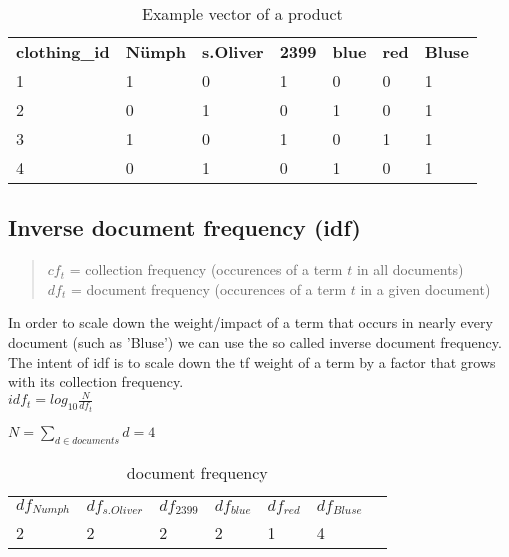 \noindent
\begin{table}[h]
    \begin{center}
    \begin{tabular}{ l l l l l l l }
        \rowcolor{Gray}
        \textbf{clothing\_id}   & \textbf{N\"umph} & \textbf{s.Oliver}   & \textbf{2399}    & \textbf{blue} & \textbf{red} & \textbf{Bluse}\\
        1                       & 1                 & 0                 & 1                 & 0             & 0             & 1\\
        2                       & 0                 & 1                 & 0                 & 1             & 0             & 1\\
        3                       & 1                 & 0                 & 1                 & 0             & 1             & 1\\
        4                       & 0                 & 1                 & 0                 & 1             & 0             & 1\\
    \end{tabular}
    \caption{Example vector of a product}
    \end{center}
\end{table}


\subsection{Inverse document frequency (idf)}
\begin{quote}
    $cf_t$ = collection frequency (occurences of a term $t$ in all documents)\\
    $df_t$ = document frequency (occurences of a term $t$ in a given document)
\end{quote}
In order to scale down the weight/impact of a term that occurs in nearly every document (such as 'Bluse') we can use the so called inverse document frequency.\\
The intent of idf is to scale down the tf weight of a term by a factor that grows with its collection frequency.\\

$idf_t = log_{10}\frac{N}{df_{t}}$

\bigskip
$N = \displaystyle\sum_{d \in documents}{d} = 4$

\bigskip
\begin{table}[h]
    \begin{center}
    \begin{tabular}{ l l l l l l l }
        \rowcolor{Gray}
        \textbf{$df_{Numph}$} & \textbf{$df_{s.Oliver}$} & \textbf{$df_{2399}$} & \textbf{$df_{blue}$} & \textbf{$df_{red}$} & \textbf{$df_{Bluse}$}\\
        2                     & 2                        & 2                     & 2                    & 1                   & 4\\
    \end{tabular}
    \caption{document frequency}
    \end{center}
\end{table}

